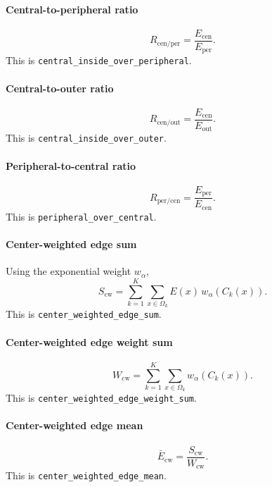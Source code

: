 \documentclass[11pt]{article}
\newcommand{\1}{\mathbf{1}}
\newcommand{\edgefield}{E}
\begin{document}
\paragraph{Central-to-peripheral ratio}
\begin{equation}
R_{\mathrm{cen/per}} = \frac{E_{\mathrm{cen}}}{E_{\mathrm{per}}}.
\end{equation}
This is \texttt{central\_inside\_over\_peripheral}.

\paragraph{Central-to-outer ratio}
\begin{equation}
R_{\mathrm{cen/out}} = \frac{E_{\mathrm{cen}}}{E_{\mathrm{out}}}.
\end{equation}
This is \texttt{central\_inside\_over\_outer}.

\paragraph{Peripheral-to-central ratio}
\begin{equation}
R_{\mathrm{per/cen}} = \frac{E_{\mathrm{per}}}{E_{\mathrm{cen}}}.
\end{equation}
This is \texttt{peripheral\_over\_central}.

\paragraph{Center-weighted edge sum}
Using the exponential weight $w_\alpha$,
\begin{equation}
S_{\mathrm{cw}} = \sum_{k=1}^{K}\sum_{x\in\Omega_k} \edgefield(x)\,w_{\alpha}(C_k(x)).
\end{equation}
This is \texttt{center\_weighted\_edge\_sum}.

\paragraph{Center-weighted edge weight sum}
\begin{equation}
W_{\mathrm{cw}} = \sum_{k=1}^{K}\sum_{x\in\Omega_k} w_{\alpha}(C_k(x)).
\end{equation}
This is \texttt{center\_weighted\_edge\_weight\_sum}.

\paragraph{Center-weighted edge mean}
\begin{equation}
\bar{E}_{\mathrm{cw}} = \frac{S_{\mathrm{cw}}}{W_{\mathrm{cw}}}.
\end{equation}
This is \texttt{center\_weighted\_edge\_mean}.
\end{document}

